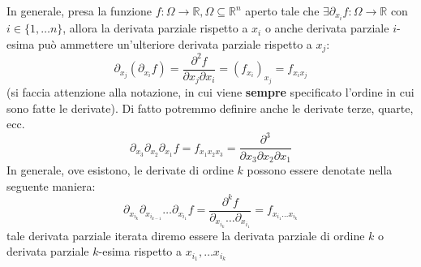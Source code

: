 \documentclass[openany]{book}
\begin{document}
In generale, presa la funzione $f: \Omega \to \mathbb{R}, \Omega \subseteq \mathbb{R}^n$ aperto tale che $\exists \partial_{x_i}f: \Omega \to \mathbb{R}$ con $i \in \{ 1, \ldots n \}$, allora la derivata parziale rispetto a $x_i$ o anche derivata parziale $i$-esima può ammettere un'ulteriore derivata parziale rispetto a $x_j$:
$$
\partial_{x_j}(\partial_{x_i} f) = \frac{\partial^2 f}{\partial x_j \partial x_i} = (f_{x_i})_{x_j} = f_{x_i x_j}
$$
(si faccia attenzione alla notazione, in cui viene \textbf{sempre} specificato l'ordine in cui sono fatte le derivate). Di fatto potremmo definire anche le derivate terze, quarte, ecc.
$$
\partial_{x_3} \partial_{x_2} \partial_{x_1} f = f_{x_1 x_2 x_3} = \frac{\partial^3}{\partial x_3 \partial x_2 \partial x_1}
$$
In generale, ove esistono, le derivate di ordine $k$ possono essere denotate nella seguente maniera:
$$
\partial_{x_{i_k}} \partial_{x_{i_{k-1}}} \ldots \partial_{x_{i_1}} f = \frac{\partial^k f}{\partial_{x_{i_k}} \ldots \partial_{x_{i_1}}} = f_{x_{i_1} \ldots x_{i_k}}
$$
tale derivata parziale iterata diremo essere la derivata parziale di ordine $k$ o derivata parziale $k$-esima rispetto a $x_{i_1}, \ldots x_{i_k}$
\end{document}
